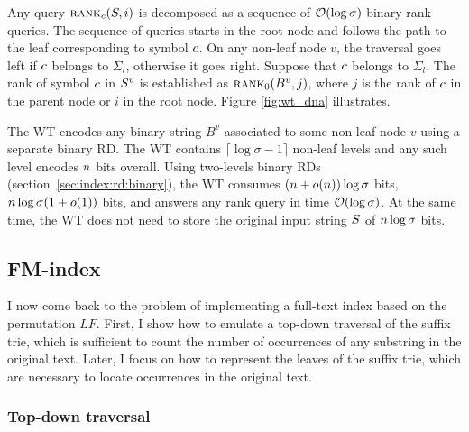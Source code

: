 Any query $\textsc{rank}_{c}(S,i)$ is decomposed as a sequence of $\mathcal{O}(\log{\sigma})$ binary rank queries.
The sequence of queries starts in the root node and follows the path to the leaf corresponding to symbol $c$.
On any non-leaf node $v$, the traversal goes left if $c$ belongs to $\Sigma_l$, otherwise it goes right.
Suppose \wlogs that $c$ belongs to $\Sigma_l$.
The rank of symbol $c$ in $S^v$ is established as $\textsc{rank}_0(B^v, j)$, where $j$ is the rank of $c$ in the parent node or $i$ in the root node.
Figure \ref{fig:wt_dna} illustrates.

The WT encodes any binary string $B^v$ associated to some non-leaf node $v$ using a separate binary RD.
The WT contains $\lceil \log \sigma - 1 \rceil$ non-leaf levels and any such level encodes $n$ bits overall.
Using two-levels binary RDs (section~\ref{sec:index:rd:binary}), the WT consumes $(n + o(n)) \log \sigma$ bits, \ie $n \log \sigma (1 + o(1))$ bits, and answers any rank query in time $\mathcal{O}(\log{\sigma})$.
At the same time, the WT does not need to store the original input string $S$ of $n \log \sigma$ bits.

\subsection{FM-index}
\label{sub:fmtrie}

I now come back to the problem of implementing a full-text index based on the permutation $LF$.
First, I show how to emulate a top-down traversal of the suffix trie, which is sufficient to count the number of occurrences of any substring in the original text.
Later, I focus on how to represent the leaves of the suffix trie, which are necessary to locate occurrences in the original text.

\subsubsection{Top-down traversal}

